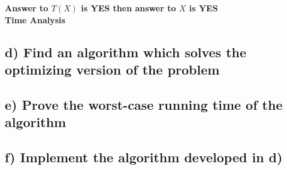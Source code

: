 \documentclass[12pt]{article}
\begin{document}
\textbf{Answer to $T(X)$ is YES then answer to $X$ is YES}\\

\textbf{Time Analysis}

\subsection*{d) Find an algorithm which solves the optimizing version of the problem}


\subsection*{e) Prove the worst-case running time of the algorithm}


\subsection*{f) Implement the algorithm developed in d)}
\end{document}
